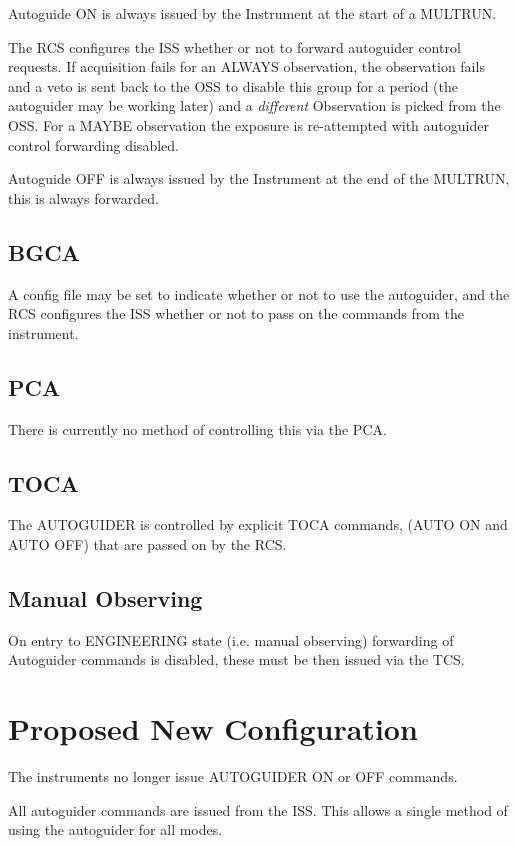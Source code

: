 \documentclass{article}
\begin{document}
Autoguide ON is always issued by the Instrument at the
start of a MULTRUN.

The RCS configures the ISS whether or not to forward autoguider control requests. 
If acquisition fails for an ALWAYS observation, 
the observation fails and a veto is sent back to the OSS to disable this group for a period 
(the autoguider may be working later) and a {\em different} {\rm Observation}
is picked from the OSS. For a MAYBE observation the exposure is re-attempted with 
autoguider control forwarding disabled.

Autoguide OFF is always issued by the Instrument at the
end of the MULTRUN, this is always forwarded.

\subsection{BGCA}

A config file may be set to indicate whether or not
to use the autoguider, and the RCS configures the ISS
whether or not to pass on the commands from the instrument.

\subsection{PCA}

There is currently no method of controlling this
via the PCA. 

\subsection{TOCA}

The AUTOGUIDER is controlled by explicit TOCA
commands, (AUTO ON and AUTO OFF) that are passed on by the RCS.

\subsection{Manual Observing}

On entry to ENGINEERING state (i.e. manual observing) forwarding of
Autoguider commands is disabled, these must be then issued via the TCS.

\section{Proposed New Configuration}

The instruments no longer issue AUTOGUIDER ON 
or OFF commands.

All autoguider commands are issued from the ISS.
This allows a single method of using the 
autoguider for all modes. 
\end{document}
